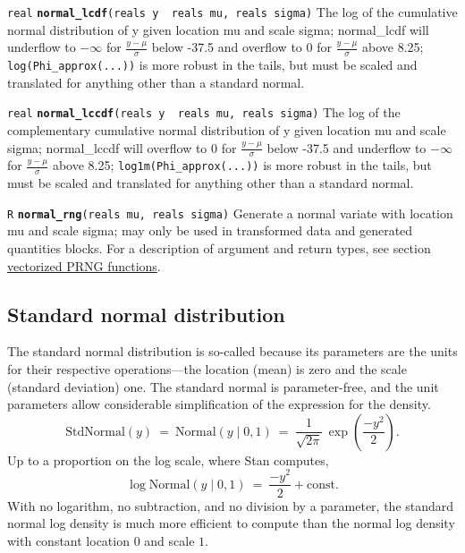 \documentclass[
  10pt,
]{book}
\begin{document}

\texttt{real} \textbf{\texttt{normal\_lcdf}}\texttt{(reals\ y\ \textbar{}\ reals\ mu,\ reals\ sigma)}\newline
The log of the cumulative normal distribution of y given location mu
and scale sigma; normal\_lcdf will underflow to \(-\infty\) for
\(\frac{{y}-{\mu}}{{\sigma}}\) below -37.5 and overflow to 0 for
\(\frac{{y}-{\mu}}{{\sigma}}\) above 8.25; \texttt{log(Phi\_approx(...))} is more
robust in the tails, but must be scaled and translated for anything other
than a standard normal.


\texttt{real} \textbf{\texttt{normal\_lccdf}}\texttt{(reals\ y\ \textbar{}\ reals\ mu,\ reals\ sigma)}\newline
The log of the complementary cumulative normal distribution of y given
location mu and scale sigma; normal\_lccdf will overflow to 0 for
\(\frac{{y}-{\mu}}{{\sigma}}\) below -37.5 and underflow to \(-\infty\)
for \(\frac{{y}-{\mu}}{{\sigma}}\) above 8.25; \texttt{log1m(Phi\_approx(...))} is
more robust in the tails, but must be scaled and translated for anything
other than a standard normal.


\texttt{R} \textbf{\texttt{normal\_rng}}\texttt{(reals\ mu,\ reals\ sigma)}\newline
Generate a normal variate with location mu and scale sigma; may only
be used in transformed data and generated quantities blocks.
For a description of argument and return types, see section
\protect\hyperlink{prng-vectorization}{vectorized PRNG functions}.

\hypertarget{standard-normal-distribution}{%
\subsection{Standard normal distribution}\label{standard-normal-distribution}}

The standard normal distribution is so-called because its parameters
are the units for their respective operations---the location (mean) is
zero and the scale (standard deviation) one. The standard normal is
parameter-free, and the unit parameters allow considerable
simplification of the expression for the density. \[
\text{StdNormal}(y) \ = \ \text{Normal}(y \mid 0, 1) \ = \
\frac{1}{\sqrt{2 \pi}} \, \exp \left( \frac{-y^2}{2} \right)\!. \] Up
to a proportion on the log scale, where Stan computes, \[ \log
\text{Normal}(y \mid 0, 1) \ = \ \frac{-y^2}{2} + \text{const}. \]
With no logarithm, no subtraction, and no division by a parameter, the
standard normal log density is much more efficient to compute than the
normal log density with constant location \(0\) and scale \(1\).
\end{document}
